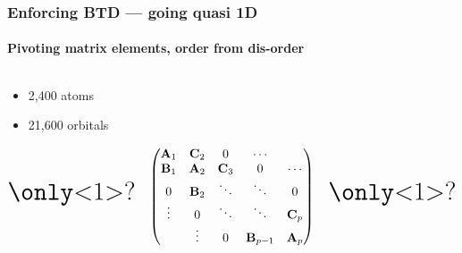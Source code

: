 \begin{frame}
  \frametitle{Enforcing BTD --- going quasi 1D}
  \framesubtitle{Pivoting matrix elements, order from dis-order}

  \begin{columns}
    \begin{column}{.45\linewidth}
      \begin{itemize}
        \item 2,400 atoms
        \item 21,600 orbitals
      \end{itemize}

      \small
      \begin{equation*}
        \text{\huge \only<1>{?}}\quad
        \begin{pmatrix}
          \mathbf A_1 & \mathbf C_2 & 0 & \cdots & \\
          \mathbf B_1 & \mathbf A_2 & \mathbf C_3 & 0& \cdots \\
          0 & \mathbf B_2 &\ddots & \ddots & 0 \\
          \vdots & 0  & \ddots &  \ddots & \mathbf C_p \\
          & \vdots  & 0  & \mathbf B_{p-1} & \mathbf A_p\\
        \end{pmatrix}\quad\text{\huge \only<1>{?}}
      \end{equation*}
      

\end{column}
\end{columns}
\end{frame}
